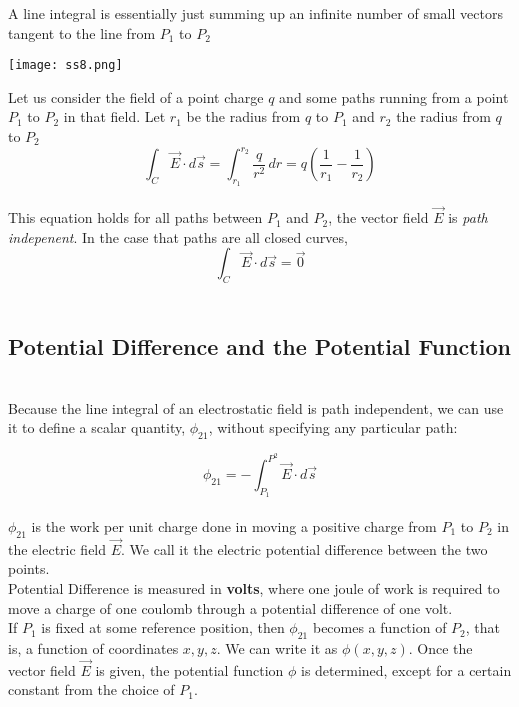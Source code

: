 \documentclass[svgnames]{article}
\begin{document}
A line integral is essentially just summing up an infinite number of small vectors tangent to the line from $P_1$ to $P_2$ \\ 

\begin{center}
\texttt{[image: ss8.png]}
\end{center} 

Let us consider the field of a point charge $q$ and some paths running from a point $P_1$ to $P_2$ in that field. Let $r_1$ be the radius from $q$ to $P_1$ and $r_2$ the radius from $q$ to $P_2$ \\ 

\[ \int_C \vec{E} \cdot d\vec{s} = \int_{r_1}^{r_2} \frac{q}{r^2} \, dr = q\left(\frac{1}{r_1} - \frac{1}{r_2} \right) \] \\

This equation holds for all paths between $P_1$ and $P_2$, the vector field $\vec{E}$ is \textit{path indepenent}. In the case that paths are all closed curves, \\


\[ \int_C \vec{E} \cdot d\vec{s} = \vec{0} \] \\

\subsection{Potential Difference and the Potential Function} \mbox{} \\

Because the line integral of an electrostatic field is path independent, we can use it to define a scalar quantity, $\phi_{21}$, without specifying any particular path: 

\[ \phi_{21} = -\int_{P_1}^{P^2} \vec{E} \cdot d\vec{s} \] \\

$\phi_{21}$ is the work per unit charge done in moving a positive charge from $P_1$ to $P_2$ in the electric field $\vec{E}$. We call it the electric potential difference between the two points. \\ 
Potential Difference is measured in \textbf{volts}, where one joule of work is required to move a charge of one coulomb through a potential difference of one volt. \\
If $P_1$ is fixed at some reference position, then $\phi_{21}$ becomes a function of $P_2$, that is, a function of coordinates $x, y, z$. We can write it as $\phi(x, y, z)$. Once the vector field $\vec{E}$ is given, the potential function $\phi$ is determined, except for a certain constant from the choice of $P_1$. \\ \\
\end{document}
